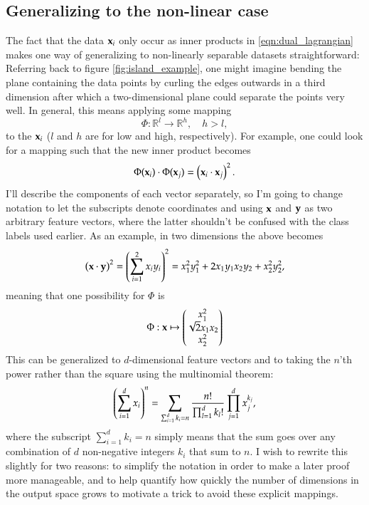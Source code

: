 \subsection{Generalizing to the non-linear case}
\label{sec:svm_nonlinear}
The fact that the data $\mathbf{x}_i$ only occur as inner products in \eqref{eqn:dual_lagrangian} makes one way of generalizing to non-linearly separable datasets straightforward: Referring back to figure \ref{fig:island_example}, one might imagine bending the plane containing the data points by curling the edges outwards in a third dimension after which a two-dimensional plane could separate the points very well. In general, this means applying some mapping
\begin{equation}
	\Phi: \mathbb{R}^l \to \mathbb{R}^h, \quad h > l,
\end{equation}
to the $\mathbf{x}_i$ ($l$ and $h$ are for low and high, respectively). For example, one could look for a mapping such that the new inner product becomes
\begin{equation}
	\Phi(\mathbf{x}_i) \cdot\Phi(\mathbf{x}_j) = \left( \mathbf{x}_i\cdot \mathbf{x}_j \right)^2. 
\end{equation}
I'll describe the components of each vector separately, so I'm going to change notation to let the subscripts denote coordinates and using $\mathbf{x}$ and $\mathbf{y}$ as two arbitrary feature vectors, where the latter shouldn't be confused with the class labels used earlier. As an example, in two dimensions the above becomes
\begin{equation}
	\left( \mathbf{x} \cdot \mathbf{y} \right)^2 = \left( \sum_{i=1}^2 x_i y_i \right)^2 = x_1^2 y_1^2 + 2x_1y_1x_2y_2 + x_2^2 y_2^2,
\end{equation}
meaning that one possibility for $\Phi$ is
\begin{equation}
	\Phi: \mathbf{x} \mapsto \begin{pmatrix} x_1^2 \\ \sqrt{2}x_1x_2 \\ x_2^2 \end{pmatrix}
\end{equation}
This can be generalized to $d$-dimensional feature vectors and to taking the $n$'th power rather than the square using the multinomial theorem:
\begin{equation}
	\left( \sum_{i=1}^d x_i \right)^n = \sum_{\sum_{i=1}^d k_i = n} \frac{n!}{\prod_{l=1}^d k_l!} \prod_{j = 1}^d x_j^{k_j}, \label{eqn:multinomial_raw}
\end{equation}
where the subscript $\sum_{i=1}^d k_i = n$ simply means that the sum goes over any combination of $d$ non-negative integers $k_i$ that sum to $n$. I wish to rewrite this slightly for two reasons: to simplify the notation in order to make a later proof more manageable, and to help quantify how quickly the number of dimensions in the output space grows to motivate a trick to avoid these explicit mappings.

